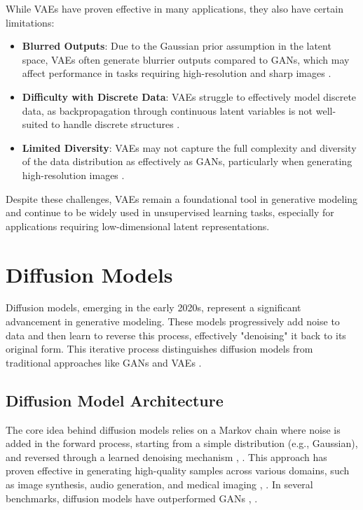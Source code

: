 While VAEs have proven effective in many applications, they also have certain limitations:
\begin{itemize}
    \item \textbf{Blurred Outputs}: Due to the Gaussian prior assumption in the latent space, VAEs often generate blurrier outputs compared to GANs, which may affect performance in tasks requiring high-resolution and sharp images \citep{10.1109/access.2020.2977671}.
    \item \textbf{Difficulty with Discrete Data}: VAEs struggle to effectively model discrete data, as backpropagation through continuous latent variables is not well-suited to handle discrete structures \citep{10.48550/arxiv.1909.13062}.
    \item \textbf{Limited Diversity}: VAEs may not capture the full complexity and diversity of the data distribution as effectively as GANs, particularly when generating high-resolution images \citep{10.48550/arxiv.2106.06500}.
\end{itemize}

Despite these challenges, VAEs remain a foundational tool in generative modeling and continue to be widely used in unsupervised learning tasks, especially for applications requiring low-dimensional latent representations.

\section{Diffusion Models}

Diffusion models, emerging in the early 2020s, represent a significant advancement in generative modeling. These models progressively add noise to data and then learn to reverse this process, effectively "denoising" it back to its original form. This iterative process distinguishes diffusion models from traditional approaches like GANs and VAEs \citep{10.48550/arxiv.2105.05233}.

\subsection{Diffusion Model Architecture}

The core idea behind diffusion models relies on a Markov chain where noise is added in the forward process, starting from a simple distribution (e.g., Gaussian), and reversed through a learned denoising mechanism \citep{10.48550/arxiv.2009.09761}, \citep{10.48550/arxiv.2206.05564}. This approach has proven effective in generating high-quality samples across various domains, such as image synthesis, audio generation, and medical imaging \citep{10.48550/arxiv.2201.11972}, \citep{10.48550/arxiv.2211.00611}. In several benchmarks, diffusion models have outperformed GANs \citep{10.48550/arxiv.2105.05233}, \citep{10.48550/arxiv.2201.00308}.

